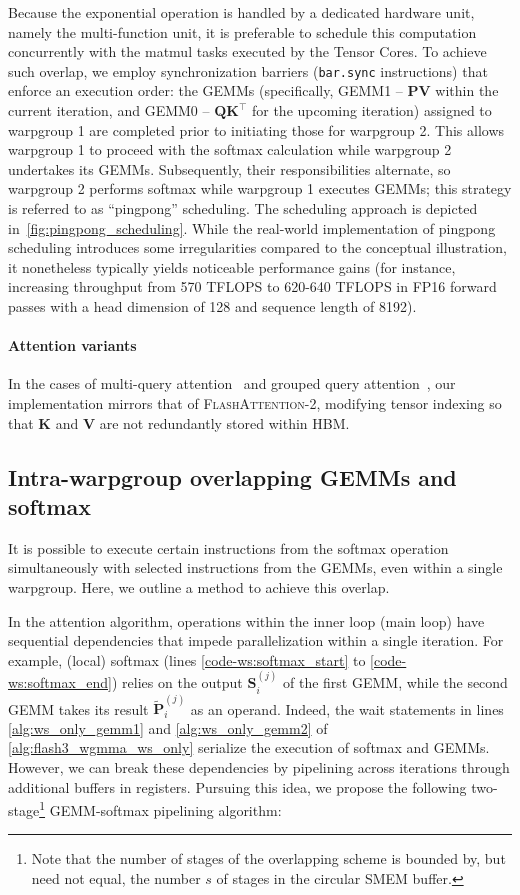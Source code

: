 Because the exponential operation is handled by a dedicated hardware unit, namely the multi-function unit, it is preferable to schedule this computation concurrently with the matmul tasks executed by the Tensor Cores. To achieve such overlap, we employ synchronization barriers (\texttt{bar.sync} instructions) that enforce an execution order: the GEMMs (specifically, GEMM1 -- $\mathbf{P} \mathbf{V}$ within the current iteration, and GEMM0 -- $\mathbf{Q} \mathbf{K}^\top$ for the upcoming iteration) assigned to warpgroup 1 are completed prior to initiating those for warpgroup 2. This allows warpgroup 1 to proceed with the softmax calculation while warpgroup 2 undertakes its GEMMs. Subsequently, their responsibilities alternate, so warpgroup 2 performs softmax while warpgroup 1 executes GEMMs; this strategy is referred to as ``pingpong'' scheduling. The scheduling approach is depicted in~\cref{fig:pingpong_scheduling}. While the real-world implementation of pingpong scheduling introduces some irregularities compared to the conceptual illustration, it nonetheless typically yields noticeable performance gains (for instance, increasing throughput from 570 TFLOPS to 620-640 TFLOPS in FP16 forward passes with a head dimension of 128 and sequence length of 8192).

\paragraph{Attention variants} In the cases of multi-query attention~\citep{shazeer2019fast} and grouped query attention~\citep{ainslie2023gqa}, our implementation mirrors that of \textsc{FlashAttention-2}, modifying tensor indexing so that $\mathbf{K}$ and $\mathbf{V}$ are not redundantly stored within HBM.

\subsection{Intra-warpgroup overlapping GEMMs and softmax}

It is possible to execute certain instructions from the softmax operation simultaneously with selected instructions from the GEMMs, even within a single warpgroup. Here, we outline a method to achieve this overlap.

In the attention algorithm, operations within the inner loop (main loop) have sequential dependencies that impede parallelization within a single iteration. For example, (local) softmax (lines \ref{code-ws:softmax_start} to \ref{code-ws:softmax_end}) relies on the output $\mathbf{S}_i^{(j)}$ of the first GEMM, while the second GEMM takes its result $\widetilde{\mathbf{P}}_i^{(j)}$ as an operand. Indeed, the wait statements in lines \ref{alg:ws_only_gemm1} and \ref{alg:ws_only_gemm2} of \cref{alg:flash3_wgmma_ws_only} serialize the execution of softmax and GEMMs. However, we can break these dependencies by pipelining across iterations through additional buffers in registers. Pursuing this idea, we propose the following two-stage\footnote{Note that the number of stages of the overlapping scheme is bounded by, but need not equal, the number $s$ of stages in the circular SMEM buffer.} GEMM-softmax pipelining algorithm:

